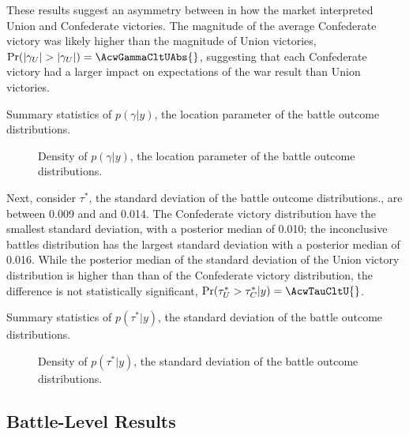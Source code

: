 \documentclass[11pt, oneside, article]{memoir}
\begin{document}
These results suggest an asymmetry between in how the market interpreted Union and Confederate victories.
The magnitude of the average Confederate victory was likely higher than the magnitude of Union victories, $\Pr(|\gamma_{U}| > |\gamma_{U}|) = \AcwGammaCltUAbs{}$, suggesting that each Confederate victory had a larger impact on expectations of the war result than Union victories.

\begin{table}[ht]
  \caption{Summary statistics of $p(\gamma|y)$, the location parameter of the battle outcome distributions.}
  \label{tab:gamma}
\end{table}

\begin{figure}[ht]
  \caption{Density of $p(\gamma|y)$, the location parameter of the battle outcome distributions.}
  \label{fig:gamma}
\end{figure}

Next, consider $\tau^{*}$, the standard deviation of the battle outcome distributions., are between 0.009 and and 0.014.
The Confederate victory distribution have the smallest standard deviation, with a posterior median of 0.010; 
the inconclusive battles distribution has the largest standard deviation with a posterior median of 0.016.
While the posterior median of the standard deviation of the Union victory distribution is higher than than of the Confederate victory distribution, the difference is not statistically significant, $\Pr(\tau^{*}_{U} > \tau^{*}_{C} | y) = \AcwTauCltU{}$.

\begin{table}[ht]
  \centering
  \caption{Summary statistics of $p(\tau^{*}|y)$, the standard deviation of the battle outcome distributions.}
  \label{tab:tau_star}
\end{table}

\begin{figure}[ht]
  \caption{Density of $p(\tau^{*}|y)$, the standard deviation of the battle outcome distributions.}
  \label{fig:tau_star}
\end{figure}

\subsection{Battle-Level Results}
\end{document}
